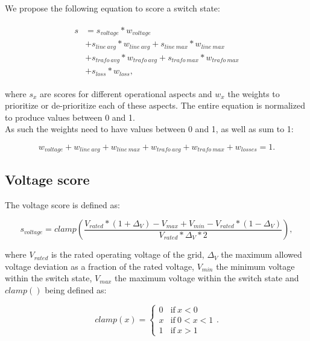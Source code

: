 We propose the following equation to score a switch state:

\begin{align}
    \begin{split}
        s &= s_{voltage} * w_{voltage}\\
        & + s_{line \ avg} * w_{line \ avg} + s_{line \ max} * w_{line \ max}\\
        & + s_{trafo \ avg} * w_{trafo \ avg} + s_{trafo \ max} * w_{trafo \ max}\\
        & + s_{loss} * w_{loss},
    \end{split}
    \label{eq:score}
\end{align}

where $s_x$ are scores for different operational aspects
and $w_x$ the weights to prioritize or de-prioritize each of these
aspects. The entire equation is normalized to produce values between 0 and 1.\\
As such the weights need to have values between 0 and 1, as well as sum to 1:

\begin{equation}
    w_{voltage} + w_{line \ avg} + w_{line \ max} + w_{trafo \ avg} + w_{trafo \ max} + w_{losses} = 1.
\end{equation}

\subsection{Voltage score}

The voltage score is defined as:

\begin{equation}
    s_{voltage} = clamp(\frac{V_{rated}*(1+\Delta_{V}) - V_{max}
                +       V_{min} - V_{rated}*(1-\Delta_{V})}
                {{V_{rated}*\Delta_{V}}*2}),
                \label{eq:score:voltage}
\end{equation}

where $V_{rated}$ is the rated operating voltage of the grid, $\Delta_V$ the maximum allowed
voltage deviation as a fraction of the rated voltage, $V_{min}$ the minimum voltage  within
the switch state, $V_{max}$ the maximum voltage within the switch state and $clamp()$ being
defined as:

\begin{equation}
    clamp(x) =
    \begin{cases}
        0 & \text{if} \ x < 0\\
        x & \text{if} \ 0 < x < 1\\
        1 & \text{if} \ x > 1
    \end{cases}.
\end{equation}


